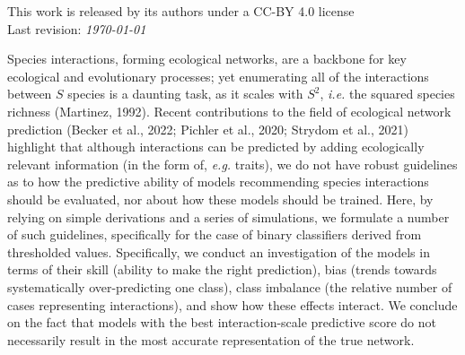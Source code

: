 \documentclass[11pt]{article}
\begin{document}
\vfill
This work is released by its authors under a CC-BY 4.0 license\hfill\ccby\\
Last revision: \emph{\today}

\clearpage
\thispagestyle{empty}

\vfill

\vfill

\clearpage
\linenumbers
\pagestyle{normal}

Species interactions, forming ecological networks, are a backbone for
key ecological and evolutionary processes; yet enumerating all of the
interactions between \(S\) species is a daunting task, as it scales with
\(S^2\), \emph{i.e.} the squared species richness (Martinez, 1992).
Recent contributions to the field of ecological network prediction
(Becker et al., 2022; Pichler et al., 2020; Strydom et al., 2021)
highlight that although interactions can be predicted by adding
ecologically relevant information (in the form of, \emph{e.g.} traits),
we do not have robust guidelines as to how the predictive ability of
models recommending species interactions should be evaluated, nor about
how these models should be trained. Here, by relying on simple
derivations and a series of simulations, we formulate a number of such
guidelines, specifically for the case of binary classifiers derived from
thresholded values. Specifically, we conduct an investigation of the
models in terms of their skill (ability to make the right prediction),
bias (trends towards systematically over-predicting one class), class
imbalance (the relative number of cases representing interactions), and
show how these effects interact. We conclude on the fact that models
with the best interaction-scale predictive score do not necessarily
result in the most accurate representation of the true network.
\end{document}
